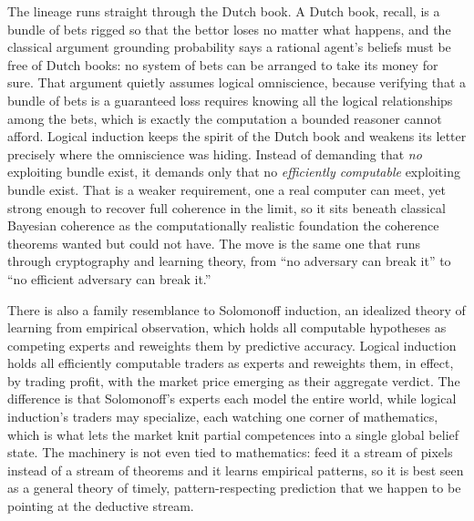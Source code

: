 \documentclass[10pt]{article}
\theoremstyle{definition}
\theoremstyle{remark}
\begin{document}
The lineage runs straight through the Dutch book. A Dutch book, recall, is a bundle of bets rigged so that the bettor loses no matter what happens, and the classical argument grounding probability says a rational agent's beliefs must be free of Dutch books: no system of bets can be arranged to take its money for sure. That argument quietly assumes logical omniscience, because verifying that a bundle of bets is a guaranteed loss requires knowing all the logical relationships among the bets, which is exactly the computation a bounded reasoner cannot afford. Logical induction keeps the spirit of the Dutch book and weakens its letter precisely where the omniscience was hiding. Instead of demanding that \emph{no} exploiting bundle exist, it demands only that no \emph{efficiently computable} exploiting bundle exist. That is a weaker requirement, one a real computer can meet, yet strong enough to recover full coherence in the limit, so it sits beneath classical Bayesian coherence as the computationally realistic foundation the coherence theorems wanted but could not have. The move is the same one that runs through cryptography and learning theory, from ``no adversary can break it'' to ``no efficient adversary can break it.''

There is also a family resemblance to Solomonoff induction, an idealized theory of learning from empirical observation, which holds all computable hypotheses as competing experts and reweights them by predictive accuracy. Logical induction holds all efficiently computable traders as experts and reweights them, in effect, by trading profit, with the market price emerging as their aggregate verdict. The difference is that Solomonoff's experts each model the entire world, while logical induction's traders may specialize, each watching one corner of mathematics, which is what lets the market knit partial competences into a single global belief state. The machinery is not even tied to mathematics: feed it a stream of pixels instead of a stream of theorems and it learns empirical patterns, so it is best seen as a general theory of timely, pattern-respecting prediction that we happen to be pointing at the deductive stream.
\end{document}

